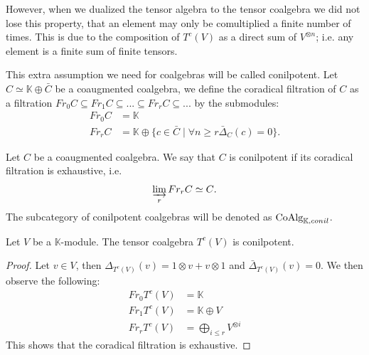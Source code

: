 \documentclass[../thesis.tex]{subfiles}
\begin{document}
            However, when we dualized the tensor algebra to the tensor coalgebra we did not lose this property, that an element may only be comultiplied a finite number of times. This is due to the composition of $T^c(V)$ as a direct sum of $V^{\otimes n}$; i.e. any element is a finite sum of finite tensors.
            
            This extra assumption we need for coalgebras will be called conilpotent. Let $C \simeq \mathbb{K} \oplus \bar{C}$ be a coaugmented coalgebra, we define the coradical filtration of $C$ as a filtration $Fr_0C \subseteq Fr_1C \subseteq ... \subseteq Fr_rC \subseteq ...$ by the submodules:
            \begin{align*}
                Fr_0C & = \mathbb{K} \\
                Fr_rC & = \mathbb{K} \oplus \{c\in\bar{C}\mid \forall n\geq r \bar{\Delta}_C(c) = 0\}.
            \end{align*}

            \begin{definition}
                Let $C$ be a coaugmented coalgebra. We say that $C$ is conilpotent if its coradical filtration is exhaustive, i.e.
                \begin{align*}
                    \varinjlim_rFr_rC \simeq C\tt{.}
                \end{align*}
                The subcategory of conilpotent coalgebras will be denoted as $\tt{CoAlg}_{\mathbb{K},conil}$.
            \end{definition}
            
            \begin{proposition}\label{prop: conilpotent-tensor}
                Let $V$ be a $\mathbb{K}$-module. The tensor coalgebra $T^c(V)$ is conilpotent.
            \end{proposition}

            \begin{proof}
                Let $v\in V$, then $\Delta_{T^c(V)}(v)=1\otimes v + v\otimes 1$ and $\bar{\Delta}_{T^c(V)}(v)=0$. We then observe the following:
                \begin{align*}
                    Fr_0T^c(V) & = \mathbb{K} \\
                    Fr_1T^c(V) & = \mathbb{K} \oplus V \\
                    Fr_rT^c(V) & = \bigoplus_{i\leq r} V^{\otimes i}
                \end{align*}
                This shows that the coradical filtration is exhaustive.
            \end{proof}
\end{document}

